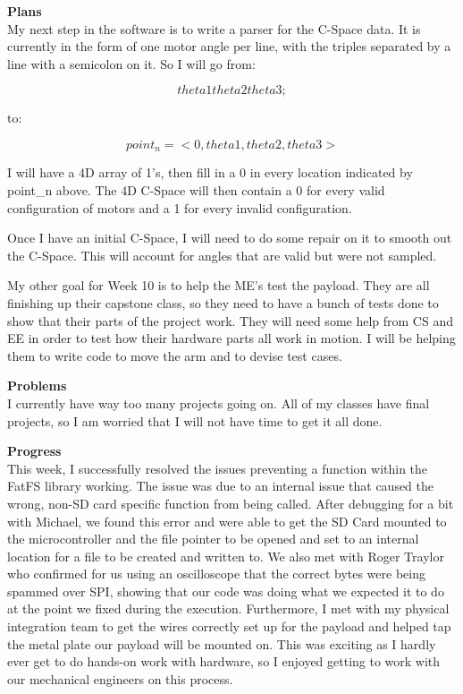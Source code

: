 \textbf{Plans} \\ 
My next step in the software is to write a parser for the C-Space data. It is currently in the form of one motor angle per line, with the triples separated by a line with a semicolon on it. So I will go from:

\[ theta1 theta2 theta3 ;\]

to:

\[ point_n = <0, theta1, theta2, theta3> \]

I will have a 4D array of 1's, then fill in a 0 in every location indicated by point\_n above. The 4D C-Space will then contain a 0 for every valid configuration of motors and a 1 for every invalid configuration.

Once I have an initial C-Space, I will need to do some repair on it to smooth out the C-Space. This will account for angles that are valid but were not sampled.

My other goal for Week 10 is to help the ME's test the payload. They are all finishing up their capstone class, so they need to have a bunch of tests done to show that their parts of the project work. They will need some help from CS and EE in order to test how their hardware parts all work in motion. I will be helping them to write code to move the arm and to devise test cases.


\textbf{Problems} \\ 
I currently have way too many projects going on. All of my classes have final projects, so I am worried that I will not have time to get it all done.

\textbf{Progress} \\ 
This week, I successfully resolved the issues preventing a function within the FatFS library working. The issue was due to an internal issue that caused 
the wrong, non-SD card specific function from being called. After debugging for a bit with Michael, we found this error and were able to get the SD 
Card mounted to the microcontroller and the file pointer to be opened and set to an internal location for a file to be created and written to. We also 
met with Roger Traylor who confirmed for us using an oscilloscope that the correct bytes were being spammed over SPI, showing that our code was doing 
what we expected it to do at the point we fixed during the execution. Furthermore, I met with my physical integration team to get the wires correctly set 
up for the payload and helped tap the metal plate our payload will be mounted on. This was exciting as I hardly ever get to do hands-on work with 
hardware, so I enjoyed getting to work with our mechanical engineers on this process.


